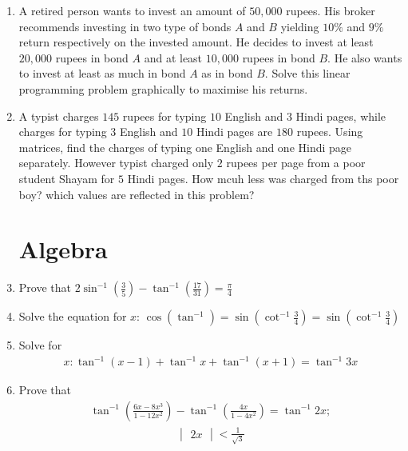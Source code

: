 \documentclass[12pt,-letter paper]{article}
\newcommand{\mydet}[1]{\ensuremath{\begin{vmatrix}#1\end{vmatrix}}}
\providecommand{\brak}[1]{\ensuremath{\left(#1\right)}}
\providecommand{\brak}[1]{\ensuremath{\left(#1\right)}}
\begin{document}
\begin{enumerate}
 
 	\item  A retired person wants to invest an amount of $50,000$ rupees. His broker recommends investing in two type of bonds $A$ and $B$ yielding $10\%$ and $9\%$ return respectively on the invested amount. He decides to invest at least
$20,000$ rupees in bond $A$ and at least $10,000$ rupees in bond $B$. He also wants to invest at least as much in bond $A$ as in bond $B$. Solve this linear programming problem graphically to maximise his returns.

	\item A typist charges $145$ rupees for typing $10$ English and $3$ Hindi pages, while charges for typing $3$ English and $10$ Hindi pages are $180$ rupees. Using matrices, 
find the charges of typing one English and one Hindi page separately. 
However typist charged only $2$ rupees per page from a poor student Shayam for $5$ Hindi pages.
How mcuh less was charged from ths poor boy? which values are reflected in this problem?

	

\section{Algebra}
	\item Prove that $ 2\sin^{-1} \brak{\frac{3}{5}} - \tan^{-1} \brak{\frac{17}{31}} = \frac{\pi}{4}$

	\item Solve the equation for $x$: $\cos (\tan^{-1}) = \sin \brak{\cot^{-1} \frac{3}{4}} = \sin \brak{\cot^{-1} \frac{3}{4}}$

	
	\item Solve for 
	\begin{align}
		x: \tan^{-1}(x-1) + \tan^{-1}x + \tan^{-1}(x+1) = \tan^{-1}3x
	\end{align}

	\item Prove that 
	\begin{align}
	\tan^{-1} \brak{\frac{6x-8x^{3}}{1-12x^{2}}} - \tan^{-1} \brak{\frac{4x}{1-4x^{2}}} = \tan^{-1}2x;
	\end{align}
	\begin{align}
		\mydet{2x} < \frac{1}{\sqrt{3}}
	\end{align}

	
\end{enumerate}
\end{document}
